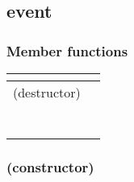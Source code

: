 \documentclass[letterpaper,10pt,english]{sphinxmanual}
\begin{document}
\subsection{event}
\label{\detokenize{programming-interface/runtime/event:event}}\label{\detokenize{programming-interface/runtime/event::doc}}
\begin{sphinxVerbatim}[commandchars=\\\{\}]
 
\end{sphinxVerbatim}
\subsubsection*{Member functions}


\begin{savenotes}\sphinxattablestart
\centering
\begin{tabulary}{\linewidth}[t]{|T|T|}
\hline

{\hyperref[\detokenize{programming-interface/runtime/event:constructor}]{}}
&\\
\hline
(destructor)
&\\
\hline
{\hyperref[\detokenize{programming-interface/runtime/event:cl-event-get}]{}}
&\\
\hline
{\hyperref[\detokenize{programming-interface/runtime/event:is-host}]{}}
&\\
\hline
{\hyperref[\detokenize{programming-interface/runtime/event:get-wait-list}]{}}
&\\
\hline
{\hyperref[\detokenize{programming-interface/runtime/event:wait}]{}}
&\\
\hline
{\hyperref[\detokenize{programming-interface/runtime/event:wait-and-throw}]{}}
&\\
\hline
{\hyperref[\detokenize{programming-interface/runtime/event:get-info}]{}}
&\\
\hline
{\hyperref[\detokenize{programming-interface/runtime/event:get-profiling-info}]{}}
&\\
\hline
\end{tabulary}
\par
\sphinxattableend\end{savenotes}


\subsubsection{(constructor)}
\label{\detokenize{programming-interface/runtime/event:constructor}}
\begin{sphinxVerbatim}[commandchars=\\\{\}]
\end{sphinxVerbatim}
\end{document}
